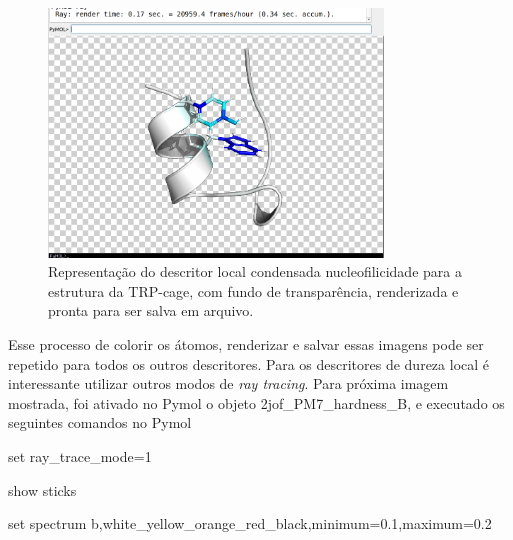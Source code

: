 \documentclass[a4paper,11pt]{refart}
\begin{document}
\hspace*{-\leftmarginwidth}
\begin{minipage}{\fullwidth}
	\begin{figure}[H]
		\begin{center}
			\includegraphics[width=3.5in]{images/tut3_img11}
			\caption{Representação do descritor local condensada nucleofilicidade para a estrutura da TRP-cage, com fundo de transparência, renderizada e pronta para ser salva em arquivo.}
			\label{fig_tut3_9}
		\end{center}
	\end{figure}
\end{minipage}

Esse processo de colorir os átomos, renderizar e salvar essas imagens pode ser repetido para todos os outros descritores. Para os descritores de dureza local é interessante utilizar outros modos de \emph{ray tracing}. Para próxima imagem mostrada, foi ativado no Pymol o objeto 2jof\_PM7\_hardness\_B, e executado os seguintes comandos no Pymol

\hspace*{-\leftmarginwidth}
\begin{minipage}{\fullwidth}
	\begin{pymol}set ray_trace_mode=1\end{pymol}
\end{minipage}

\hspace*{-\leftmarginwidth}
\begin{minipage}{\fullwidth}
	\begin{pymol}show sticks\end{pymol}
\end{minipage}

\hspace*{-\leftmarginwidth}
\begin{minipage}{\fullwidth}
	\begin{pymol}set spectrum b,white_yellow_orange_red_black,minimum=0.1,maximum=0.2\end{pymol}
\end{minipage}
\end{document}
